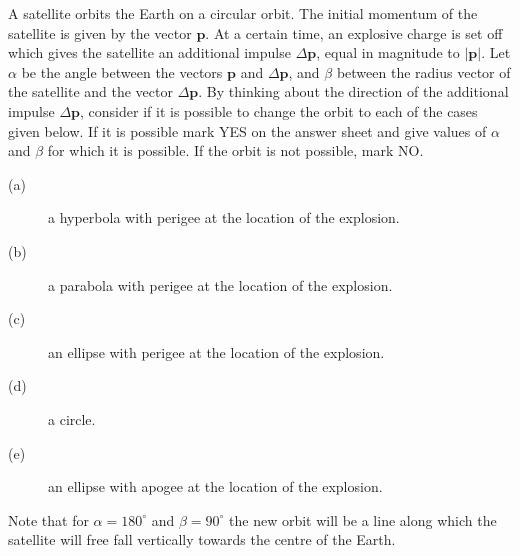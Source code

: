 A satellite orbits the Earth on a circular orbit. The initial momentum of the
satellite is given by the vector $\mathbf{p}$. At a certain time, an explosive
charge is set off which gives the satellite an additional impulse
$\Delta\mathbf{p}$, equal in magnitude to $|\mathbf{p}|$. Let $\alpha$ be the
angle between the vectors $\mathbf{p}$ and $\Delta\mathbf{p}$, and $\beta$
between the radius vector of the satellite and the vector $\Delta\mathbf{p}$.
By thinking about the direction of the additional impulse $\Delta\mathbf{p}$,
consider if it is possible to change the orbit to each of the cases given
below. If it is possible mark YES on the answer sheet and give values of
$\alpha$ and $\beta$ for which it is possible. If the orbit is not possible,
mark NO.

\begin{description}
\item[(a)] a hyperbola with perigee at the location of the explosion.
\item[(b)] a parabola with perigee at the location of the explosion.
\item[(c)] an ellipse with perigee at the location of the explosion.
\item[(d)] a circle.
\item[(e)] an ellipse with apogee at the location of the explosion.
\end{description}

Note that for $\alpha = 180^\circ$ and $\beta = 90^\circ$ the new orbit will be
a line along which the satellite will free fall vertically towards the centre
of the Earth.
